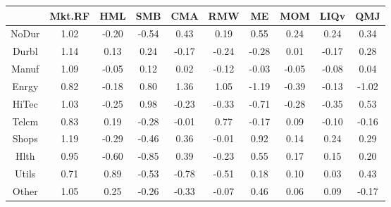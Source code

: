 \begin{tabular}{cccccccccc}
  \hline
 & Mkt.RF & HML & SMB & CMA & RMW & ME & MOM & LIQv & QMJ \\ 
  \hline
NoDur & 1.02 & -0.20 & -0.54 & 0.43 & 0.19 & 0.55 & 0.24 & 0.24 & 0.34 \\ 
  Durbl & 1.14 & 0.13 & 0.24 & -0.17 & -0.24 & -0.28 & 0.01 & -0.17 & 0.28 \\ 
  Manuf & 1.09 & -0.05 & 0.12 & 0.02 & -0.12 & -0.03 & -0.05 & -0.08 & 0.04 \\ 
  Enrgy & 0.82 & -0.18 & 0.80 & 1.36 & 1.05 & -1.19 & -0.39 & -0.13 & -1.02 \\ 
  HiTec & 1.03 & -0.25 & 0.98 & -0.23 & -0.33 & -0.71 & -0.28 & -0.35 & 0.53 \\ 
  Telcm & 0.83 & 0.19 & -0.28 & -0.01 & 0.77 & -0.17 & 0.09 & -0.10 & -0.16 \\ 
  Shops & 1.19 & -0.29 & -0.46 & 0.36 & -0.01 & 0.92 & 0.14 & 0.24 & 0.29 \\ 
  Hlth & 0.95 & -0.60 & -0.85 & 0.39 & -0.23 & 0.55 & 0.17 & 0.15 & 0.20 \\ 
  Utils & 0.71 & 0.89 & -0.53 & -0.78 & -0.51 & 0.18 & 0.10 & 0.03 & 0.43 \\ 
  Other & 1.05 & 0.25 & -0.26 & -0.33 & -0.07 & 0.46 & 0.06 & 0.09 & -0.17 \\ 
   \hline
\end{tabular}
